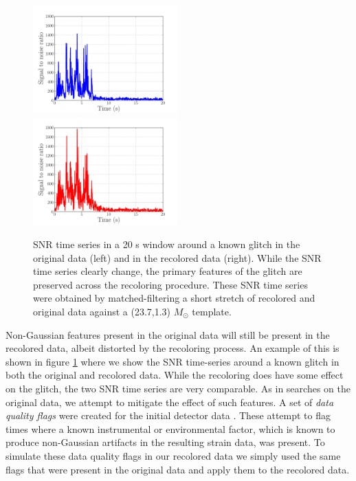 \begin{figure}
\centering
\includegraphics[width=0.495\textwidth]
{papers/mdc2013_submission/figure4A}
\includegraphics[width=0.495\textwidth]
{papers/mdc2013_submission/figure4B}
\caption{\label{fig:NOISE_recolored_glitch}
SNR time series in a 20 s window around a known glitch in the original data
(left) and in the recolored data (right). While the SNR time series clearly
change, the primary features of the glitch are preserved across the recoloring
procedure. These SNR time series were obtained by matched-filtering a short 
stretch of recolored and original data against a (23.7,1.3) $M_{\odot}$ 
template.}
\end{figure}

Non-Gaussian features present in the original data will still be present in
the recolored data, albeit distorted by the recoloring process.
An example of this is shown in figure
\ref{fig:NOISE_recolored_glitch} where we show the SNR time-series around a
known glitch in both the original and recolored data. While the recoloring does
have some effect on the glitch, the two SNR time series are very comparable. As
in searches on the original data, we attempt to mitigate the effect of such
features. A set of \emph{data quality flags} were created for the initial 
detector
data \cite{Aasi:2012wd,LIGOS6Detchar}.
These attempt to flag times where a known instrumental or
environmental factor, which is known to produce non-Gaussian artifacts in the
resulting strain data, was present. To simulate these data quality flags in our
recolored data we simply used the same flags that were present in the original
data and apply them to the recolored data.

